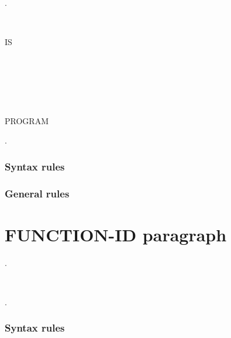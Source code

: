 \begin{syntax}
  .
  \begin{1=}
     \\
    \literal
  \end{1=}
  \begin{0-1}  \literal \end{0-1}

  \begin{0-1} IS
    \begin{1=}
      \begin{1+}
         \\

        \begin{1=}
           \\
        \end{1=}
      \end{1+} \\

    \end{1=}
    PROGRAM
  \end{0-1}.
\end{syntax}

\subsubsection{Syntax rules}

\subsubsection{General rules}

\section{FUNCTION-ID paragraph}

\begin{syntax}
  .
  \begin{1=}
    \functionname \\
    \literal
  \end{1=}
  \begin{0-1}  \literal \end{0-1}.
\end{syntax}

\subsubsection{Syntax rules}


